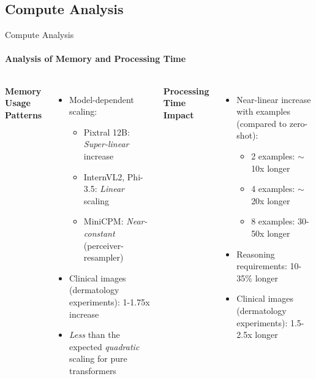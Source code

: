 \subsection{Compute Analysis}
\begin{frame}{Compute Analysis}
\framesubtitle{Analysis of Memory and Processing Time}
  \vspace{-1em}
  \begin{columns}[T]
    \column{\customcolumnwidth}
      \textbf{Memory Usage Patterns}
      \begin{itemize}
        \item Model-dependent scaling:
        \begin{itemize}
          \item Pixtral 12B: \emph{Super-linear} increase
          \item InternVL2, Phi-3.5: \emph{Linear} scaling
          \item MiniCPM: \emph{Near-constant} (perceiver-resampler)
        \end{itemize}
        \item Clinical images (dermatology experiments): 1-1.75x increase
        \item \emph{Less} than the expected \emph{quadratic} scaling for pure transformers~
      \end{itemize}
    \column{\customcolumnwidth}
      \textbf{Processing Time Impact}
      \begin{itemize}
        \item Near-linear increase with examples (compared to zero-shot):
        \begin{itemize}
          \item 2 examples: \(\sim\)10x longer
          \item 4 examples: \(\sim\)20x longer
          \item 8 examples: 30-50x longer
        \end{itemize}
        \item Reasoning requirements: 10-35\% longer
        \item Clinical images (dermatology experiments): 1.5-2.5x longer
      \end{itemize}
  \end{columns}
\end{frame}

